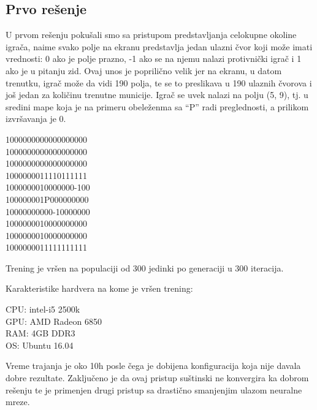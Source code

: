 \documentclass[a4paper]{article}
\begin{document}
\subsection {Prvo rešenje}
\par U prvom rešenju pokušali smo sa pristupom predstavljanja celokupne okoline igrača, naime svako polje na ekranu predstavlja jedan ulazni čvor koji može imati vrednosti: 0 ako je polje prazno, -1 ako se na njemu nalazi protivnički igrač i 1 ako je u pitanju zid. Ovaj unos je poprilično velik jer na ekranu, u datom trenutku, igrač može da vidi 190 polja, te se to preslikava u 190 ulaznih čvorova i još jedan za količinu trenutne municije.  Igrač se uvek nalazi na polju (5, 9), tj. u sredini mape koja je na primeru obeleženma sa  “P” radi preglednosti, a prilikom izvršavanja je 0.  
\newline
\begin{tcolorbox}
\begin {center}
1000000000000000000 \\
1000000000000000000\\
1000000000000000000\\
1000000011110111111\\
1000000010000000-100\\
100000001P000000000\\
10000000000-10000000\\
1000000010000000000\\
1000000010000000000\\
1000000011111111111\\
\end{center}
\end{tcolorbox}

Trening je vršen na populaciji od 300 jedinki po generaciji u 300 iteracija.
\newline
\begin{tcolorbox}
\begin {center}
Karakteristike hardvera na kome je vršen trening: \\
\end {center}
CPU: intel-i5 2500k \\
GPU: AMD Radeon 6850 \\
RAM: 4GB DDR3 \\
OS: Ubuntu 16.04 \\
\end{tcolorbox}
\noindent Vreme trajanja je oko 10h posle čega je dobijena konfiguracija koja nije davala dobre rezultate. Zaključeno je da ovaj pristup suštinski ne konvergira ka dobrom rešenju te je primenjen drugi pristup sa drastično smanjenjim ulazom neuralne mreze.
\end{document}
